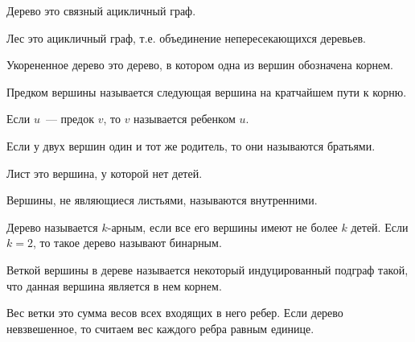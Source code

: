 
\begin{definition}
  Дерево это связный ацикличный граф.
\end{definition}

\begin{definition}
  Лес это ацикличный граф, т.е. объединение непересекающихся деревьев.
\end{definition}

\begin{definition}
  Укорененное дерево это дерево, в котором одна из вершин обозначена корнем.
\end{definition}

\begin{definition}
  Предком вершины называется следующая вершина на кратчайшем пути к корню.
\end{definition}

\begin{definition}
  Если \(u\)~--- предок \(v\), то \(v\) называется ребенком \(u\).
\end{definition}

\begin{definition}
  Если у двух вершин один и тот же родитель, то они называются братьями.
\end{definition}

\begin{definition}
  Лист это вершина, у которой нет детей.
\end{definition}

\begin{definition}
  Вершины, не являющиеся листьями, называются внутренними.
\end{definition}

\begin{definition}
  Дерево называется \(k\)-арным, если все его вершины имеют не более \(k\)
  детей. Если \(k = 2\), то такое дерево называют бинарным.
\end{definition}

\begin{definition}
  Веткой вершины в дереве называется некоторый индуцированный подграф такой, что
  данная вершина является в нем корнем.
\end{definition}

\begin{definition}
  Вес ветки это сумма весов всех входящих в него ребер. Если дерево
  невзвешенное, то считаем вес каждого ребра равным единице.
\end{definition}

